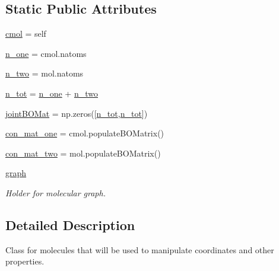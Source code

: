 \subsection*{Static Public Attributes}
\begin{DoxyCompactItemize}
\item 
\hyperlink{classmolSimplify_1_1Classes_1_1mol3D_1_1mol3D_a6082942a23525bf058199ac963f8fb3f}{cmol} = self
\item 
\hyperlink{classmolSimplify_1_1Classes_1_1mol3D_1_1mol3D_a85ba7bb05563f6cffe5f1fa520f9536b}{n\+\_\+one} = cmol.\+natoms
\item 
\hyperlink{classmolSimplify_1_1Classes_1_1mol3D_1_1mol3D_afe514a4cc67fbbaaed3126a567d9a760}{n\+\_\+two} = mol.\+natoms
\item 
\hyperlink{classmolSimplify_1_1Classes_1_1mol3D_1_1mol3D_a7ed8c7afdf881581c5d10c9989c1f25c}{n\+\_\+tot} = \hyperlink{classmolSimplify_1_1Classes_1_1mol3D_1_1mol3D_a85ba7bb05563f6cffe5f1fa520f9536b}{n\+\_\+one} + \hyperlink{classmolSimplify_1_1Classes_1_1mol3D_1_1mol3D_afe514a4cc67fbbaaed3126a567d9a760}{n\+\_\+two}
\item 
\hyperlink{classmolSimplify_1_1Classes_1_1mol3D_1_1mol3D_a396404adf257258babdac3667d0b245f}{joint\+B\+O\+Mat} = np.\+zeros(\mbox{[}\hyperlink{classmolSimplify_1_1Classes_1_1mol3D_1_1mol3D_a7ed8c7afdf881581c5d10c9989c1f25c}{n\+\_\+tot},\hyperlink{classmolSimplify_1_1Classes_1_1mol3D_1_1mol3D_a7ed8c7afdf881581c5d10c9989c1f25c}{n\+\_\+tot}\mbox{]})
\item 
\hyperlink{classmolSimplify_1_1Classes_1_1mol3D_1_1mol3D_abc6a798a634ff50738051588f9c95c10}{con\+\_\+mat\+\_\+one} = cmol.\+populate\+B\+O\+Matrix()
\item 
\hyperlink{classmolSimplify_1_1Classes_1_1mol3D_1_1mol3D_a79b378686db3c193cdab193283248b75}{con\+\_\+mat\+\_\+two} = mol.\+populate\+B\+O\+Matrix()
\item 
\hyperlink{classmolSimplify_1_1Classes_1_1mol3D_1_1mol3D_aa14392db397618bd85a06f44f43360a2}{graph}
\begin{DoxyCompactList}\small\item\em Holder for molecular graph. \end{DoxyCompactList}\end{DoxyCompactItemize}


\subsection{Detailed Description}
Class for molecules that will be used to manipulate coordinates and other properties. 

